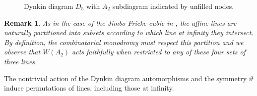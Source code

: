 \documentclass[a4paper,reqno]{amsart}
\numberwithin{equation}{section}
\newtheorem{remark}[theorem]{Remark}
\numberwithin{equation}{section}
\begin{document}
\begin{figure}[htb]
    \centering
   \caption{Dynkin diagram $D_5$ with $A_2$ subdiagram indicated by unfilled nodes.}
    \label{fig:dynkinD5}
\end{figure}

\begin{remark} \label{rem:combinatorialremarkPIV}
    As in the case of the Jimbo-Fricke cubic in , the affine lines are naturally partitioned into subsets according to which line at infinity they intersect.  
    By definition, the combinatorial monodromy must respect this partition and we observe that $W(A_2)$ acts faithfully when restricted to any of these four sets of three lines.
\end{remark}

The nontrivial action of the Dynkin diagram automorphisms and the symmetry $\vartheta$ induce permutations of lines, including those at infinity.
\end{document}
